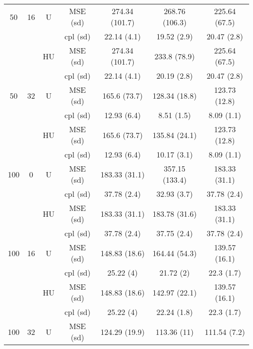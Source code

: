 \documentclass[11pt,a4paper]{article}
\begin{document}
\begin{table}[h!]
\begin{tabular}{|c|c|c|c|c|c|c|}
\hline %
50 & 16 & U&MSE (sd) & 274.34 (101.7) & 268.76 (106.3) & 225.64 (67.5) \\	
& & & cpl (sd) & 22.14 (4.1) & 19.52 (2.9) & 20.47 (2.8) \\
 &  &HU &MSE (sd) & 274.34 (101.7) & 233.8 (78.9) & 225.64 (67.5) \\
& & & cpl (sd) & 22.14 (4.1) & 20.19 (2.8) & 20.47 (2.8) \\
\hline %
50 & 32 & U&MSE (sd) & 165.6 (73.7) & 128.34 (18.8) & 123.73 (12.8) \\
& & & cpl (sd) & 12.93 (6.4) & 8.51 (1.5) & 8.09 (1.1) \\
 &  &HU &MSE (sd) & 165.6 (73.7) & 135.84 (24.1) & 123.73 (12.8) \\
& & &cpl (sd) & 12.93 (6.4) & 10.17 (3.1) & 8.09 (1.1) \\
\hline
\hline %
100 & 0 & U&  MSE (sd) & 183.33 (31.1) & 357.15 (133.4) & 183.33 (31.1) \\
& & & cpl (sd) & 37.78 (2.4) & 32.93 (3.7) & 37.78 (2.4) \\
 &  &HU &  MSE (sd) & 183.33 (31.1) & 183.78 (31.6) & 183.33 (31.1) \\
& & &  cpl (sd) & 37.78 (2.4) & 37.75 (2.4) & 37.78 (2.4) \\
\hline %
100 & 16 & U& MSE (sd) & 148.83 (18.6) & 164.44 (54.3) & 139.57 (16.1) \\
& & & cpl (sd) & 25.22 (4) & 21.72 (2) & 22.3 (1.7) \\
 &  &HU &  MSE (sd) & 148.83 (18.6) & 142.97 (22.1) & 139.57 (16.1) \\
& & & cpl (sd) & 25.22 (4) & 22.24 (1.8) & 22.3 (1.7) \\
\hline %
100 & 32 & U& MSE (sd) & 124.29 (19.9) & 113.36 (11) & 111.54 (7.2) \\

\end{tabular}
\end{table}
\end{document}
